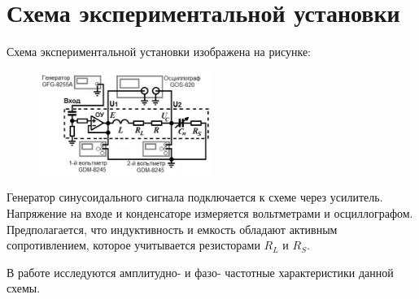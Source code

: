 \section*{Схема экспериментальной установки}

Схема экспериментальной установки изображена на рисунке:

\begin{figure}[H]
	\centering
	\includegraphics[width=0.5\textwidth]{../res/exp_scheme.png}
\end{figure}

Генератор синусоидального сигнала подключается к схеме через усилитель. Напряжение на входе и конденсаторе измеряется вольтметрами и осциллографом. Предполагается, что индуктивность и емкость обладают активным сопротивлением, которое учитывается резисторами $R_L$ и $R_S$.

В работе исследуются амплитудно- и фазо- частотные характеристики данной схемы.